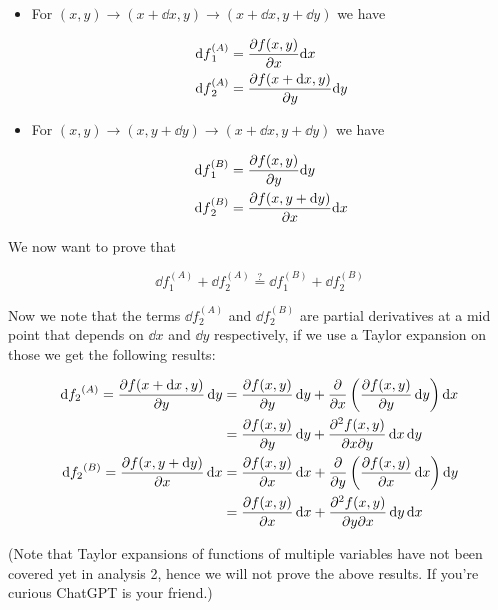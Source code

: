 \documentclass[10pt]{extarticle}
\begin{document}
\begin{itemize}
    \item For $(x, y) \to (x + \dd{x}, y) \to (x + \dd{x}, y + \dd{y})$ we have

          \begin{align*}
              \dd{f}_1^{(A)} & = \pdv{f(x,y)}{x} \dd x          \\
              \dd{f}_2^{(A)} & = \pdv{f(x + \dd x, y)}{y} \dd y
          \end{align*}

    \item For $(x, y) \to (x, y + \dd{y}) \to (x + \dd{x}, y + \dd{y})$ we have

          \begin{align*}
              \dd{f}_1^{(B)} & = \pdv{f(x,y)}{y} \dd y          \\
              \dd{f}_2^{(B)} & = \pdv{f(x, y + \dd y)}{x} \dd x
          \end{align*}
\end{itemize}

We now want to prove that

$$
    \dd{f}_1^{(A)} + \dd{f}_2^{(A)} \stackrel{?}{=} \dd{f}_1^{(B)} + \dd{f}_2^{(B)}
$$

Now we note that the terms $\dd{f}_2^{(A)}$ and $\dd{f}_2^{(B)}$ are partial derivatives at a mid point that depends on $\dd{x}$ and $\dd{y}$ respectively,
if we use a Taylor expansion on those we get the following results:

\begin{align*}
    \dd{f_2}^{(A)} = \pdv{f(x + \dd{x}, y)}{y} \dd{y} & = \pdv{f(x, y)}{y} \dd{y} + \pdv{x} \left( \pdv{f(x, y)}{y} \dd{y} \right) \dd{x} \\
                                                      & = \pdv{f(x, y)}{y} \dd{y} + \pdv{f(x, y)}{x}{y} \dd{x} \dd{y}                     \\
    \dd{f_2}^{(B)} = \pdv{f(x, y + \dd{y})}{x} \dd{x} & = \pdv{f(x, y)}{x} \dd{x} + \pdv{y} \left( \pdv{f(x, y)}{x} \dd{x} \right) \dd{y} \\
                                                      & = \pdv{f(x, y)}{x} \dd{x} + \pdv{f(x, y)}{y}{x} \dd{y} \dd{x}
\end{align*}

(Note that Taylor expansions of functions of multiple variables have not been covered yet in analysis 2, hence we will not prove the above results.
If you're curious ChatGPT is your friend.)
\end{document}
